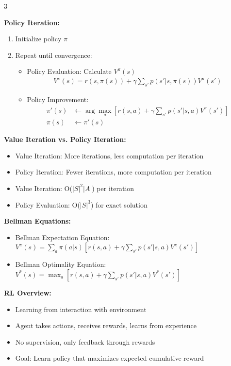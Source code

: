 \documentclass[10pt,landscape]{article}
\begin{document}
\begin{multicols}{3}
\begin{tcolorbox}[breakable, title=10.1 MDP Planning Algorithms, colback=mdp]
\textbf{Policy Iteration:}
\begin{enumerate}[leftmargin=*,noitemsep,topsep=0pt]
    \item Initialize policy $\pi$
    \item Repeat until convergence:
    \begin{itemize}[leftmargin=*,noitemsep]
        \item Policy Evaluation: Calculate $V^\pi(s)$
        \begin{align}
        V^\pi(s) = r(s, \pi(s)) + \gamma \sum_{s'} p(s'|s, \pi(s))V^\pi(s')
        \end{align}
        \item Policy Improvement:
        \begin{align}
        \pi'(s) &\leftarrow \arg\max_a \left[r(s, a) + \gamma \sum_{s'} p(s'|s, a)V^\pi(s')\right]\\
        \pi(s) &\leftarrow \pi'(s)
        \end{align}
    \end{itemize}
\end{enumerate}

\textbf{Value Iteration vs. Policy Iteration:}
\begin{itemize}[leftmargin=*,noitemsep,topsep=0pt]
    \item Value Iteration: More iterations, less computation per iteration
    \item Policy Iteration: Fewer iterations, more computation per iteration
    \item Value Iteration: O($|S|^2|A|$) per iteration
    \item Policy Evaluation: O($|S|^3$) for exact solution
\end{itemize}

\textbf{Bellman Equations:}
\begin{itemize}[leftmargin=*,noitemsep,topsep=0pt]
    \item Bellman Expectation Equation:
    $V^\pi(s) = \sum_a \pi(a|s)[r(s,a) + \gamma\sum_{s'} p(s'|s,a)V^\pi(s')]$
    \item Bellman Optimality Equation:
    $V^*(s) = \max_a [r(s,a) + \gamma\sum_{s'} p(s'|s,a)V^*(s')]$
\end{itemize}
\end{tcolorbox}

\begin{tcolorbox}[breakable, title=11. Reinforcement Learning Concepts, colback=rl]
\textbf{RL Overview:}
\begin{itemize}[leftmargin=*,noitemsep,topsep=0pt]
    \item Learning from interaction with environment
    \item Agent takes actions, receives rewards, learns from experience
    \item No supervision, only feedback through rewards
    \item Goal: Learn policy that maximizes expected cumulative reward
\end{itemize}


\end{tcolorbox}
\end{multicols}
\end{document}
